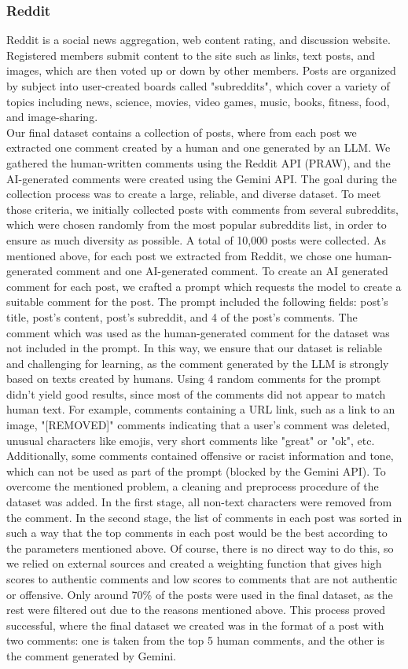 \documentclass[11pt]{article}
\begin{document}
\subsubsection{Reddit}
Reddit is a social news aggregation, web content rating, and discussion website. Registered members submit content to the site such as links, text posts, and images, which are then voted up or down by other members. Posts are organized by subject into user-created boards called "subreddits", which cover a variety of topics including news, science, movies, video games, music, books, fitness, food, and image-sharing.\\
Our final dataset contains a collection of posts, where from each post we extracted one comment created by a human and one generated by an LLM.
We gathered the human-written comments using the Reddit API (PRAW), and the AI-generated comments were created using the Gemini API. The goal during the collection process was to create a large, reliable, and diverse dataset. 
To meet those criteria, we initially collected posts with comments from several subreddits, which were chosen randomly from the most popular subreddits list, in order to ensure as much diversity as possible. A total of 10,000 posts were collected.
As mentioned above, for each post we extracted from Reddit, we chose one human-generated comment and one AI-generated comment. To create an AI generated comment for each post, we crafted a prompt which requests the model to create a suitable comment for the post. The prompt included the following fields: post's title, post's content, post's subreddit, and 4 of the post's comments. The comment which was used as the human-generated comment for the dataset was not included in the prompt. In this way, we ensure that our dataset is reliable and challenging for learning, as the comment generated by the LLM is strongly based on texts created by humans.
Using 4 random comments for the prompt didn't yield good results, since most of the comments did not appear to match human text. For example, comments containing a URL link, such as a link to an image, "[REMOVED]" comments indicating that a user's comment was deleted, unusual characters like emojis, very short comments like "great" or "ok", etc. Additionally, some comments contained offensive or racist information and tone, which can not be used as part of the prompt (blocked by the Gemini API).
To overcome the mentioned problem, a cleaning and preprocess procedure of the dataset was added. In the first stage, all non-text characters were removed from the comment. In the second stage, the list of comments in each post was sorted in such a way that the top comments in each post would be the best according to the parameters mentioned above. Of course, there is no direct way to do this, so we relied on external sources and created a weighting function that gives high scores to authentic comments and low scores to comments that are not authentic or offensive. Only around 70\% of the posts were used in the final dataset, as the rest were filtered out due to the reasons mentioned above.
This process proved successful, where the final dataset we created was in the format of a post with two comments: one is taken from the top 5 human comments, and the other is the comment generated by Gemini.
\end{document}
